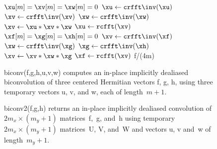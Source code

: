 \documentclass[final]{siamltex}
\begin{document}
\begin{figure}[htbp]
\begin{minipage}{0.48\linewidth}
\begin{function}[H]
  \medskip
  $\xu[m]=\xv[m]=\xw[m]=0$\;
  $\xu \leftarrow \crfft\inv(\xu)$\;
  $\xv \leftarrow \crfft\inv(\xv)$\;
  $\xw \leftarrow \crfft\inv(\xw)$\;
  $\xv \leftarrow \xu * \xv * \xw$\;
  $\xu \leftarrow \rcfft(\xv)$\;
  \medskip
  $\xf[m]=\xg[m]=\xh[m]=0$\;
  $\xv \leftarrow \crfft\inv(\xf)$\;
  $\xw \leftarrow \crfft\inv(\xg)$\;
  $\xg \leftarrow \crfft\inv(\xh)$\;
  $\xv \leftarrow \xv * \xw * \xg$\;
  $\xf \leftarrow \rcfft(\xv)$\;
  \medskip
  \Return f/(4m)\;
\caption{biconv({\sf f},{\sf g},{\sf h},{\sf u},{\sf v},{\sf w}) computes
an in-place implicitly dealiased biconvolution of three centered
Hermitian vectors {\sf f}, {\sf g}, {\sf h}, using three temporary vectors
{\sf u}, {\sf v}, and {\sf w}, each of length~$m+1$.}\label{biconv}
\end{function}
\end{minipage}
%
\begin{minipage}{0.5\linewidth}
\begin{function}[H]
  \Return \xf\;
\caption{biconv2({\sf f},{\sf g},{\sf h}) 
returns an in-place implicitly dealiased convolution of \hbox{$2m_x\times
(m_y+1)$} matrices~{\sf f},~{\sf g}, and~{\sf h} using
temporary \hbox{$2m_x\times (m_y+1)$} matrices~{\sf U}, {\sf V}, and~{\sf W} and
vectors {\sf u}, {\sf v} and~{\sf w} of length~$m_y+1$.
}\label{biconv2}
\end{function}
\end{minipage}
\end{figure}
\end{document}
